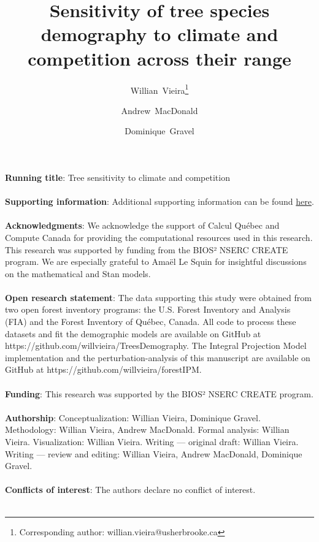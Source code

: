 \documentclass[12pt]{article}
\title{Sensitivity of tree species demography to climate and competition
across their range}
\author[1]{Willian~Vieira\thanks{Corresponding author: willian.vieira@usherbrooke.ca}}
\author[1]{Andrew~MacDonald}
\author[1]{Dominique~Gravel}
\affil[1]{Département de biologie, Université de Sherbrooke, Sherbrooke,
QC, Canada}
\date{}
\begin{document}
\maketitle
\small{{\bf Running title}: Tree sensitivity to climate and
competition}\\\\
\small{{\bf Supporting information}: Additional supporting information can be found \href{https://willvieira.github.io/ms\_forest-ipm-sensitivity/suppInfo.pdf}{here}.}\\\\
\small{{\bf Acknowledgments}: We acknowledge the support of Calcul
Québec and Compute Canada for providing the computational resources used
in this research. This research was supported by funding from the BIOS²
NSERC CREATE program. We are especially grateful to Amaël Le Squin for
insightful discussions on the mathematical and Stan models.}\\\\
\small{{\bf Open research statement}: The data supporting this study
were obtained from two open forest inventory programs: the U.S. Forest
Inventory and Analysis (FIA) and the Forest Inventory of Québec, Canada.
All code to process these datasets and fit the demographic models are
available on GitHub at https://github.com/willvieira/TreesDemography.
The Integral Projection Model implementation and the
perturbation-analysis of this manuscript are available on GitHub at
https://github.com/willvieira/forestIPM.}\\\\
\small{{\bf Funding}: This research was supported by the BIOS² NSERC
CREATE program.}\\\\
\small{{\bf Authorship}: Conceptualization: Willian Vieira, Dominique
Gravel. Methodology: Willian Vieira, Andrew MacDonald. Formal analysis:
Willian Vieira. Visualization: Willian Vieira. Writing --- original
draft: Willian Vieira. Writing --- review and editing: Willian Vieira,
Andrew MacDonald, Dominique Gravel.}\\\\
\small{{\bf Conflicts of interest}: The authors declare no conflict of
interest.}\\\\
\end{document}
